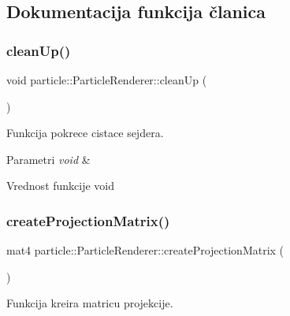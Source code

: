 \subsection{Dokumentacija funkcija članica}
\mbox{\label{classparticle_1_1ParticleRenderer_a42823bfdbfdad50b7ef4e55286526cef}} 
\subsubsection{\texorpdfstring{clean\+Up()}{cleanUp()}}
{\footnotesize\ttfamily void particle\+::\+Particle\+Renderer\+::clean\+Up (\begin{DoxyParamCaption}\item[{void}]{ }\end{DoxyParamCaption})}



Funkcija pokrece cistace sejdera. 


\begin{DoxyParams}{Parametri}
{\em void} & \\
\hline
\end{DoxyParams}
\begin{DoxyReturn}{Vrednost funkcije}
void 
\end{DoxyReturn}
\mbox{\label{classparticle_1_1ParticleRenderer_ad16ef052cf8dbf03a0bfa6f06066a37f}} 
\subsubsection{\texorpdfstring{create\+Projection\+Matrix()}{createProjectionMatrix()}}
{\footnotesize\ttfamily mat4 particle\+::\+Particle\+Renderer\+::create\+Projection\+Matrix (\begin{DoxyParamCaption}{ }\end{DoxyParamCaption})\hspace{0.3cm}{\ttfamily [private]}}



Funkcija kreira matricu projekcije. 


